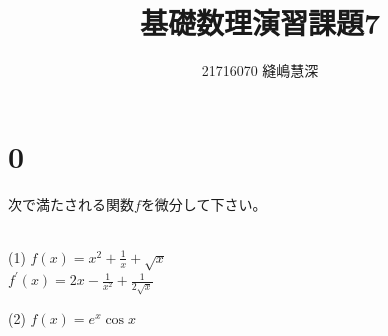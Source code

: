\documentclass[fleqn]{jsarticle}
\title{基礎数理演習課題7}
\author{21716070 縫嶋慧深}
\begin{document}
	\maketitle

    \section*{0}
    次で満たされる関数$f$を微分して下さい。\\\\
    \begin{description}
		\setlength{\itemsep}{0.5cm}
        \begin{spacing}{1.2}

            \item[(1)]
                $ f(x) = x^2 + \frac{1}{x} + \sqrt{x} $ \\
                $ f^{\prime}(x) = 2x - \frac{1}{x^2} + \frac{1}{2\sqrt{x}} $

            \item[(2)]
                $ f(x) = e^x\cos{x} $ \\



\end{spacing}
\end{description}
\end{document}
